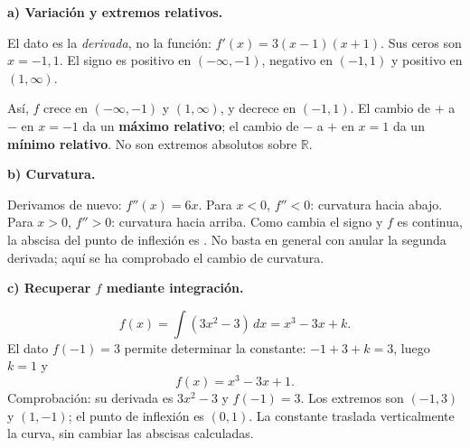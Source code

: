 \textbf{a) Variación y extremos relativos.}\par\nopagebreak[4]
El dato es la \emph{derivada}, no la función: $f'(x)=3(x-1)(x+1)$. Sus ceros son $x=-1,1$. El signo es positivo en $(-\infty,-1)$, negativo en $(-1,1)$ y positivo en $(1,\infty)$.

Así, $f$ crece en $(-\infty,-1)$ y $(1,\infty)$, y decrece en $(-1,1)$. El cambio de $+$ a $-$ en $x=-1$ da un \textbf{máximo relativo}; el cambio de $-$ a $+$ en $x=1$ da un \textbf{mínimo relativo}. No son extremos absolutos sobre $\mathbb R$.

\textbf{b) Curvatura.}\par\nopagebreak[4]
Derivamos de nuevo: $f''(x)=6x$. Para $x<0$, $f''<0$: curvatura hacia abajo. Para $x>0$, $f''>0$: curvatura hacia arriba. Como cambia el signo y $f$ es continua, la abscisa del punto de inflexión es . No basta en general con anular la segunda derivada; aquí se ha comprobado el cambio de curvatura.

\textbf{c) Recuperar $f$ mediante integración.}\par\nopagebreak[4]
\[
f(x)=\int(3x^2-3)\,dx=x^3-3x+k.
\]
El dato $f(-1)=3$ permite determinar la constante: $-1+3+k=3$, luego $k=1$ y
\[
\boxed{f(x)=x^3-3x+1.}
\]
Comprobación: su derivada es $3x^2-3$ y $f(-1)=3$. Los extremos son $(-1,3)$ y $(1,-1)$; el punto de inflexión es $(0,1)$. La constante traslada verticalmente la curva, sin cambiar las abscisas calculadas.
